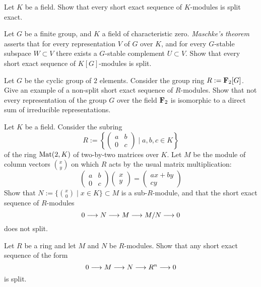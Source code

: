\begin{exercise}Let $K$ be a field. Show that every short exact sequence of $K$-modules is split exact.
\end{exercise}

\begin{exercise}
Let $G$ be a finite group, and $K$ a field of characteristic zero. \emph{Maschke's theorem} asserts that for every representation $V$ of $G$ over $K$, and for every $G$-stable subspace $W\subset V$ there exists a $G$-stable complement $U\subset V$. 
Show that every short exact sequence of $K[G]$-modules is split. 
\end{exercise}

\begin{exercise}[$\star$]
Let $G$ be the cyclic group of $2$ elements. Consider the group ring $R:={\mathbf{F}}_2[G]$. Give an example of a non-split short exact sequence of $R$-modules. Show that not every representation of the group $G$ over the field ${\mathbf{F}}_2$ is isomorphic to a direct sum of irreducible representations. 
\end{exercise}


\begin{exercise}Let $K$ be a field. Consider the subring
\[
	R := \left\{ \left(\begin{matrix} a & b \\ 0 & c \end{matrix}\right) \mid a,b,c\in K \right \}
\]
of the ring $\operatorname{Mat}(2,K)$ of two-by-two matrices over $K$.
Let $M$ be the module of column vectors $x \choose {y}$ on which $R$ acts by the usual matrix multiplication:
\[
\left(\begin{matrix} a & b \\ 0 & c \end{matrix}\right)
\left(\begin{matrix} x  \\ y \end{matrix}\right) =
\left(\begin{matrix} ax + by  \\ cy \end{matrix}\right)
\]
Show that $N:= \{ {x \choose 0} \mid x \in K \} \subset M$ is a sub-$R$-module, and that the short exact sequence
of $R$-modules
\[
	0 \longrightarrow N \longrightarrow M \longrightarrow M/N \longrightarrow 0
\]
does not split.
\end{exercise}

\begin{exercise}\label{exc:free-module-split-short-exact-sequence}
Let $R$ be a ring and let $M$ and $N$ be $R$-modules. Show that any short exact sequence of the form
\[
	0 \longrightarrow M \longrightarrow N \longrightarrow R^n \longrightarrow 0
\]
is split. 
\end{exercise}

